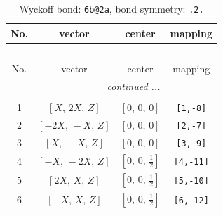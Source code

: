 \documentclass[fleqn,8pt]{jsarticle}
\begin{document}
\begin{longtable}{cccc}
\caption{Wyckoff bond: {\tt 6b@2a}, bond symmetry: {\tt .2.}}
 \\
 \hline \hline
No. & vector & center & mapping \\ \hline \endfirsthead

\multicolumn{3}{l}{\tablename\ \thetable{}} \\
 \hline \hline
No. & vector & center & mapping \\ \hline \endhead

 \hline \hline
\multicolumn{3}{r}{\footnotesize\it continued ...} \\ \endfoot

 \hline \hline
\multicolumn{3}{r}{} \\ \endlastfoot

1 & $\left[ X,\, 2 X,\, Z \right]$ & $\left[ 0,\, 0,\, 0 \right]$ & {\tt [1,-8]} \\ \hline
2 & $\left[ - 2 X,\, - X,\, Z \right]$ & $\left[ 0,\, 0,\, 0 \right]$ & {\tt [2,-7]} \\ \hline
3 & $\left[ X,\, - X,\, Z \right]$ & $\left[ 0,\, 0,\, 0 \right]$ & {\tt [3,-9]} \\ \hline
4 & $\left[ - X,\, - 2 X,\, Z \right]$ & $\left[ 0,\, 0,\, \frac{1}{2} \right]$ & {\tt [4,-11]} \\ \hline
5 & $\left[ 2 X,\, X,\, Z \right]$ & $\left[ 0,\, 0,\, \frac{1}{2} \right]$ & {\tt [5,-10]} \\ \hline
6 & $\left[ - X,\, X,\, Z \right]$ & $\left[ 0,\, 0,\, \frac{1}{2} \right]$ & {\tt [6,-12]} \\
\end{longtable}
\renewcommand{\arraystretch}{1.2}
\end{document}
